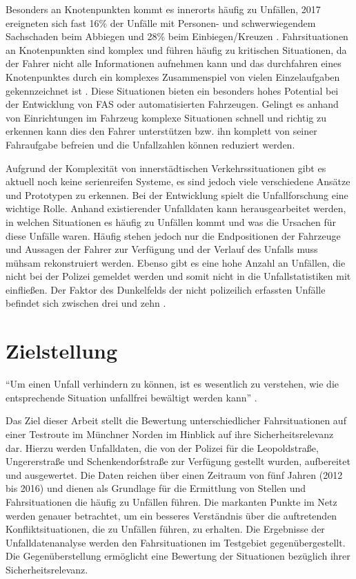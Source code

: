 Besonders an Knotenpunkten kommt es innerorts häufig zu Unfällen, 2017 ereigneten sich fast 16\% der Unfälle mit Personen- und schwerwiegendem Sachschaden beim Abbiegen und 28\% beim Einbiegen/Kreuzen \parencite[S.68]{StatistischesBundesamt.2018b}. Fahrsituationen an Knotenpunkten sind komplex und führen häufig zu kritischen Situationen, da der Fahrer nicht alle Informationen aufnehmen kann \parencite[S.2]{Gerstenberger.17.02.2015} und das durchfahren eines Knotenpunktes durch ein komplexes Zusammenspiel von vielen Einzelaufgaben gekennzeichnet ist \parencite[S.51]{Zademach.24.09.2015}. Diese Situationen bieten ein besonders hohes Potential bei der Entwicklung von FAS oder automatisierten Fahrzeugen. Gelingt es anhand von Einrichtungen im Fahrzeug komplexe Situationen schnell und richtig zu erkennen kann dies den Fahrer unterstützen bzw. ihn komplett von seiner Fahraufgabe befreien und die Unfallzahlen können reduziert werden. 

Aufgrund der Komplexität von innerstädtischen Verkehrssituationen gibt es aktuell noch keine serienreifen Systeme, es sind jedoch viele verschiedene Ansätze und Prototypen zu erkennen. Bei der Entwicklung spielt die Unfallforschung eine wichtige Rolle. Anhand existierender Unfalldaten kann herausgearbeitet werden, in welchen Situationen es häufig zu Unfällen kommt und was die Ursachen für diese Unfälle waren. Häufig stehen jedoch nur die Endpositionen der Fahrzeuge und Aussagen der Fahrer zur Verfügung und der Verlauf des Unfalls muss mühsam rekonstruiert werden. Ebenso gibt es eine hohe Anzahl an Unfällen, die nicht bei der Polizei gemeldet werden und somit nicht in die Unfallstatistiken mit einfließen. Der Faktor des Dunkelfelds der nicht polizeilich erfassten Unfälle befindet sich zwischen drei und zehn \parencite[S.151]{Huguenin.2017}.

\section{Zielstellung}

\enquote{Um einen Unfall verhindern zu können, ist es wesentlich zu verstehen, wie die entsprechende Situation unfallfrei bewältigt werden kann} \parencite[S.8]{Vollrath.2006}.

Das Ziel dieser Arbeit stellt die Bewertung unterschiedlicher Fahrsituationen auf einer Testroute im Münchner Norden im Hinblick auf ihre Sicherheitsrelevanz dar. Hierzu werden Unfalldaten, die von der Polizei für die Leopoldstraße, Ungererstraße und Schenkendorfstraße zur Verfügung gestellt wurden, aufbereitet und ausgewertet. Die Daten reichen über einen Zeitraum von fünf Jahren (2012 bis 2016) und dienen als Grundlage für die Ermittlung von Stellen und Fahrsituationen die häufig zu Unfällen führen. Die markanten Punkte im Netz werden genauer betrachtet, um ein besseres Verständnis über die auftretenden Konfliktsituationen, die zu Unfällen führen, zu erhalten. Die Ergebnisse der Unfalldatenanalyse werden den Fahrsituationen im Testgebiet gegenübergestellt. Die Gegenüberstellung ermöglicht eine Bewertung der Situationen bezüglich ihrer Sicherheitsrelevanz.

